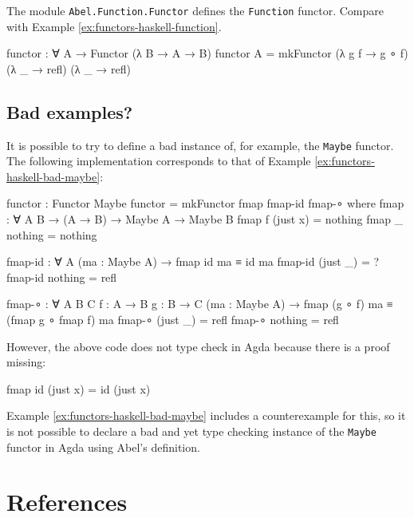 \begin{example}
  \label{ex:functors-agda-function}

  The module \texttt{Abel.Function.Functor} defines the
  \texttt{Function} functor. Compare with Example
  \ref{ex:functors-haskell-function}.
  \begin{codeagda}
    functor : ∀ {A} → Functor (λ B → A → B)
    functor {A} = mkFunctor (λ g f → g ∘ f) (λ _ → refl) (λ _ → refl)
  \end{codeagda}
\end{example}

\subsection{Bad examples?}
\label{sec:functors-agda-bad-examples}

\begin{example}
  \label{ex:functors-agda-bad-maybe}
  It is possible to try to define a bad instance of, for example,
  the \texttt{Maybe} functor. The following implementation corresponds
  to that of Example \ref{ex:functors-haskell-bad-maybe}:
  \begin{codeagda}
    functor : Functor Maybe
    functor = mkFunctor fmap fmap-id fmap-∘
      where
        fmap : ∀ {A B} → (A → B) → Maybe A → Maybe B
        fmap f (just x) = nothing
        fmap _ nothing  = nothing

        fmap-id : ∀ {A} (ma : Maybe A) → fmap id ma ≡ id ma
        fmap-id (just _) = ?
        fmap-id nothing  = refl

        fmap-∘ : ∀ {A B C} {f : A → B} {g : B → C}
        (ma : Maybe A) → fmap (g ∘ f) ma ≡ (fmap g ∘ fmap f) ma
        fmap-∘ (just _) = refl
        fmap-∘ nothing  = refl
  \end{codeagda}
  However, the above code does not type check in Agda because there is
  a proof missing:
  \begin{codeagda}
    fmap id (just x) = id (just x)
  \end{codeagda}
  Example \ref{ex:functors-haskell-bad-maybe} includes a
  counterexample for this, so it is not possible to declare a bad and
  yet type checking instance of the \texttt{Maybe} functor in Agda
  using Abel's definition.
\end{example}

\section{References}
\label{sec:functors-references}


\clearemptydoublepage
